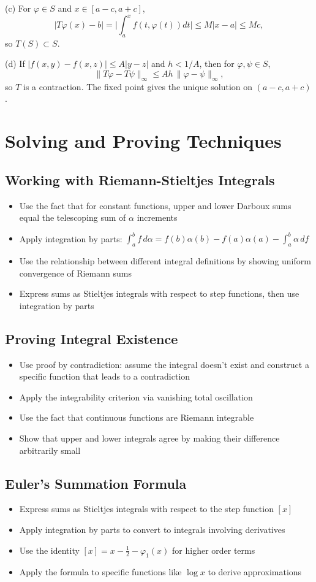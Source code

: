 (c) For $\varphi\in S$ and $x\in[a-c,a+c]$,
\[|T\varphi(x)-b|=\Big|\int_a^x f(t,\varphi(t))dt\Big|\le M|x-a|\le Mc,
\]
so $T(S)\subset S$.

(d) If $|f(x,y)-f(x,z)|\le A|y-z|$ and $h<1/A$, then for $\varphi,\psi\in S$,
\[\|T\varphi-T\psi\|_\infty\le A h\,\|\varphi-\psi\|_\infty,
\]
so $T$ is a contraction. The fixed point gives the unique solution on $(a-c,a+c)$.
\medskip

\section{Solving and Proving Techniques}

\subsection*{Working with Riemann-Stieltjes Integrals}
\begin{itemize}
\item Use the fact that for constant functions, upper and lower Darboux sums equal the telescoping sum of $\alpha$ increments
\item Apply integration by parts: $\int_a^b f\,d\alpha = f(b)\alpha(b)-f(a)\alpha(a)-\int_a^b \alpha\,df$
\item Use the relationship between different integral definitions by showing uniform convergence of Riemann sums
\item Express sums as Stieltjes integrals with respect to step functions, then use integration by parts
\end{itemize}

\subsection*{Proving Integral Existence}
\begin{itemize}
\item Use proof by contradiction: assume the integral doesn't exist and construct a specific function that leads to a contradiction
\item Apply the integrability criterion via vanishing total oscillation
\item Use the fact that continuous functions are Riemann integrable
\item Show that upper and lower integrals agree by making their difference arbitrarily small
\end{itemize}

\subsection*{Euler's Summation Formula}
\begin{itemize}
\item Express sums as Stieltjes integrals with respect to the step function $[x]$
\item Apply integration by parts to convert to integrals involving derivatives
\item Use the identity $[x] = x - \frac{1}{2} - \varphi_1(x)$ for higher order terms
\item Apply the formula to specific functions like $\log x$ to derive approximations
\end{itemize}

